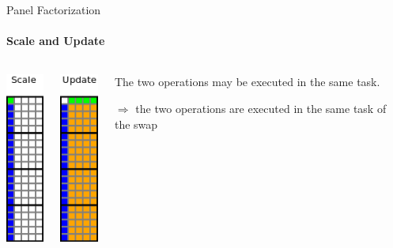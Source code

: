 \documentclass{beamer}
\begin{document}
\begin{frame}{Panel Factorization}
\framesubtitle{Scale and Update}
\begin{columns}
\begin{column}{.25\textwidth}
\begin{center}
\includegraphics[scale=0.8]{panel_scale.png}
\end{center}
\end{column}
\hfill
\begin{column}{.25\textwidth}
\begin{center}
\includegraphics[scale=0.8]{panel_update.png}
\end{center}
\end{column}
\hfill
\begin{column}{.50\textwidth}
The two operations may be executed in the same task.
\begin{center}
\begin{exampleblock}{}
$\Longrightarrow$ the two operations are executed in the same task of the swap
\end{exampleblock}{}
\end{center}
\end{column}
\end{columns}
\end{frame}
\end{document}
